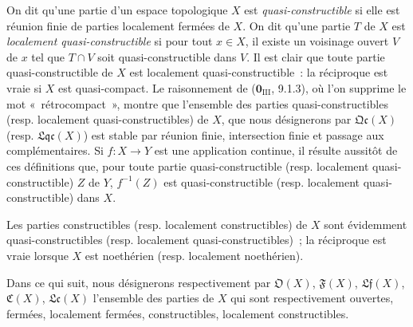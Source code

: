 \begin{env}[10.1.1]
\label{IV.10.1.1-fr}
On dit qu'une partie d'un espace topologique $X$ est
\emph{quasi-constructible} si elle est réunion finie de parties localement
fermées de $X$. On dit qu'une partie $T$ de $X$ est \emph{localement
quasi-constructible} si pour tout $x\in X$, il existe un voisinage ouvert $V$
de $x$ tel que $T\cap V$ soit quasi-constructible dans $V$. Il est clair que
toute partie quasi-constructible de $X$ est localement quasi-constructible~:
la réciproque est vraie si $X$ est quasi-compact. Le raisonnement de
($\mathbf 0_{\mathrm{III}}$, 9.1.3), où l'on supprime le mot
«~rétrocompact~», montre que l'ensemble des parties quasi-constructibles
(resp. localement quasi-constructibles) de $X$, que nous désignerons par
$\mathfrak{Qc}(X)$ (resp. $\mathfrak{Lqc}(X)$) est stable par réunion finie,
intersection finie et passage aux complémentaires. Si $f:X\to Y$ est une
application continue, il résulte aussitôt de ces définitions que, pour toute
partie quasi-constructible (resp. localement quasi-constructible) $Z$ de $Y$,
$f^{-1}(Z)$ est quasi-constructible (resp. localement quasi-constructible)
dans $X$.

Les parties constructibles (resp. localement constructibles) de $X$ sont
évidemment quasi-constructibles (resp. localement quasi-constructibles)~; la
réciproque est vraie lorsque $X$ est noethérien (resp. localement
noethérien).

Dans ce qui suit, nous désignerons respectivement par $\mathfrak O(X)$,
$\mathfrak F(X)$, $\mathfrak{Lf}(X)$, $\mathfrak C(X)$, $\mathfrak{Lc}(X)$
l'ensemble des parties de $X$ qui sont respectivement ouvertes, fermées,
localement fermées, constructibles, localement constructibles.
\end{env}

